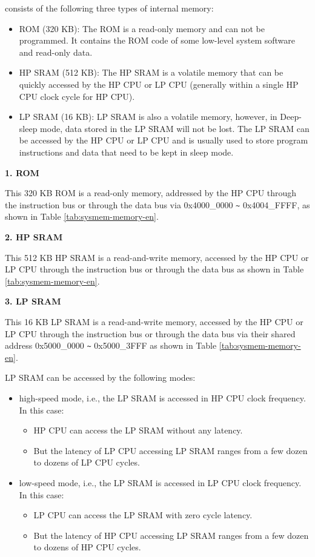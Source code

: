 \documentclass[main\_\_EN.tex]{subfiles}
\begin{document}
\chipname{} consists of the following three types of internal memory:

\begin{itemize}
    \item ROM (320 KB): The ROM is a read-only memory and can not be programmed. It contains the ROM code of some low-level system software and read-only data.
    \item HP SRAM (512 KB): The HP SRAM is a volatile memory that can be quickly accessed by the HP CPU or LP CPU (generally within a single HP CPU clock cycle for HP CPU).
    \item LP SRAM (16 KB): LP SRAM is also a volatile memory, however, in Deep-sleep mode, data stored in the LP SRAM will not be lost. The LP SRAM can be accessed by the HP CPU or LP CPU and is usually used to store program instructions and data that need to be kept in sleep mode.
\end{itemize}

{\bfseries 1. ROM}

This 320 KB ROM is a read-only memory, addressed by the HP CPU through the instruction bus or through the data bus via 0x4000\_0000 \verb+~+ 0x4004\_FFFF, as shown in Table \ref{tab:sysmem-memory-en}.


{\bfseries  2. HP SRAM}
\label{other:sysmem-internal-sram-0}

This 512 KB HP SRAM is a read-and-write memory, accessed by the HP CPU or LP CPU through the instruction bus or through the data bus as shown in Table  \ref{tab:sysmem-memory-en}.


{\bfseries 3. LP SRAM}

This 16 KB LP SRAM is a read-and-write memory, accessed by the HP CPU or LP CPU through the instruction bus or through the data bus via their shared address 0x5000\_0000 \verb+~+ 0x5000\_3FFF as shown in Table \ref{tab:sysmem-memory-en}.

LP SRAM can be accessed by the following modes:
\begin{itemize}
    \item high-speed mode, i.e., the LP SRAM is accessed in HP CPU clock frequency. In this case: 
        \begin{itemize}
            \item HP CPU can access the LP SRAM without any latency.
            \item But the latency of LP CPU accessing LP SRAM ranges from a few dozen to dozens of LP CPU cycles.
        \end{itemize}
    \item low-speed mode, i.e., the LP SRAM is accessed in LP CPU clock frequency. In this case:
        \begin{itemize}
            \item LP CPU can access the LP SRAM with zero cycle latency.
            \item But the latency of HP CPU accessing LP SRAM ranges from a few dozen to dozens of HP CPU cycles.
        \end{itemize}
\end{itemize}
\end{document}
